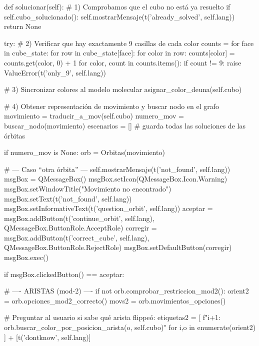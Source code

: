    def solucionar(self):
        # 1) Comprobamos que el cubo no está ya resuelto
        if self.cubo_solucionado():
            self.mostrarMensaje(t('already_solved', self.lang))
            return None

        try:
            # 2) Verificar que hay exactamente 9 casillas de cada color
            counts = {}
            for face in cube_state:
                for row in cube_state[face]:
                    for color in row:
                        counts[color] = counts.get(color, 0) + 1
            for color, count in counts.items():
                if count != 9:
                    raise ValueError(t('only_9', self.lang))

            # 3) Sincronizar colores al modelo molecular
            asignar_color_deuna(self.cubo)

            # 4) Obtener representación de movimiento y buscar nodo en el grafo
            movimiento = traducir_a_mov(self.cubo)
            numero_mov = buscar_nodo(movimiento)
            escenarios = [] # guarda todas las soluciones de las órbitas

            if numero_mov is None:
                orb = Orbitas(movimiento)
                
                # --- Caso “otra órbita” ---
                self.mostrarMensaje(t('not_found', self.lang))
                msgBox = QMessageBox()
                msgBox.setIcon(QMessageBox.Icon.Warning)
                msgBox.setWindowTitle("Movimiento no encontrado")
                msgBox.setText(t('not_found', self.lang))
                msgBox.setInformativeText(t('question_orbit', self.lang))
                aceptar = msgBox.addButton(t('continue_orbit', self.lang), QMessageBox.ButtonRole.AcceptRole)
                corregir = msgBox.addButton(t('correct_cube', self.lang),    QMessageBox.ButtonRole.RejectRole)
                msgBox.setDefaultButton(corregir)
                msgBox.exec()

                if msgBox.clickedButton() == aceptar:
                    
                    # ---- ARISTAS (mod-2) ----
                    if not orb.comprobar_restriccion_mod2():
                        orient2 = orb.opciones_mod2_correcto()  
                        movs2 = orb.movimientos_opciones()             

                        # Preguntar al usuario si sabe qué arista flippeó:
                        etiquetas2 = [
                            f"{i+1}: {orb.buscar_color_por_posicion_arista(o, self.cubo)}"
                            for i,o in enumerate(orient2)
                        ] + [t('dontknow', self.lang)]
                        
